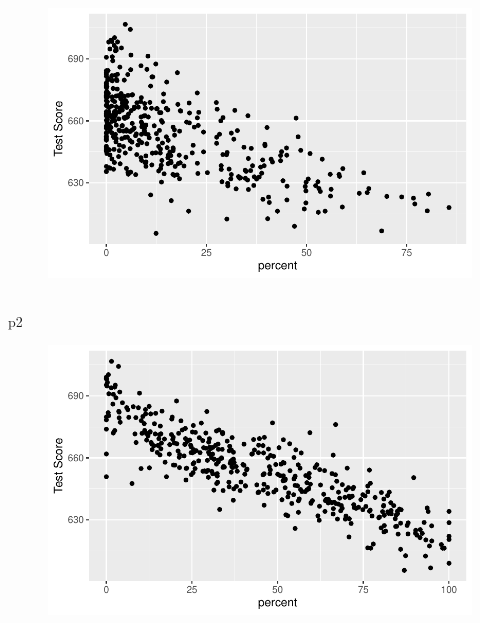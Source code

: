 \documentclass[
  letterpaper,
  DIV=11,
  numbers=noendperiod]{scrartcl}
\newenvironment{Shaded}{\begin{snugshade}}{\end{snugshade}}
\newcommand{\NormalTok}[1]{\textcolor[rgb]{0.85,0.87,0.91}{#1}}
\begin{document}
\begin{figure}[H]

{\centering \includegraphics{Ch6_7_SW_files/figure-pdf/unnamed-chunk-9-1.pdf}

}

\end{figure}

\hypertarget{section-15}{%
\subsection{}\label{section-15}}

\begin{Shaded}
\begin{Highlighting}[]
\NormalTok{p2}
\end{Highlighting}
\end{Shaded}

\begin{figure}[H]

{\centering \includegraphics{Ch6_7_SW_files/figure-pdf/unnamed-chunk-10-1.pdf}

}

\end{figure}
\end{document}
